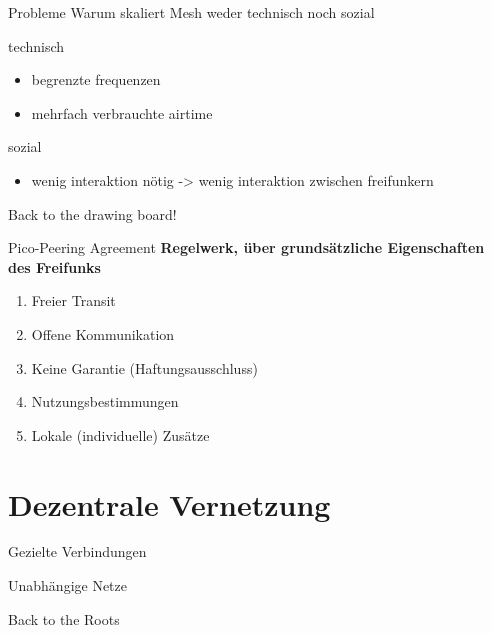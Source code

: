 \documentclass{beamer}
\begin{document}

	\begin{frame}{Probleme}
	Warum skaliert Mesh weder technisch noch sozial
	\begin{block}{technisch}
		\begin{itemize}
			\item begrenzte frequenzen
			\item mehrfach verbrauchte airtime
		\end{itemize}

	\end{block}
	\begin{block}{sozial}
		\begin{itemize}
			\item wenig interaktion nötig -> wenig interaktion zwischen freifunkern
		\end{itemize}
	\end{block}
	\end{frame}

	\begin{frame}[standout]
		Back to the drawing board!
	\end{frame}

	\begin{frame}{Pico-Peering Agreement}
		\textbf{Regelwerk, über grundsätzliche Eigenschaften des Freifunks}

		\begin{enumerate}
			\item Freier Transit
			\item Offene Kommunikation
			\item Keine Garantie (Haftungsausschluss)
			\item Nutzungsbestimmungen
			\item Lokale (individuelle) Zusätze
		\end{enumerate}
	\end{frame}

	\section{Dezentrale Vernetzung}
	\begin{frame}{Gezielte Verbindungen}
	\end{frame}
	\begin{frame}{Unabhängige Netze}
	\end{frame}
	\begin{frame}{Back to the Roots}
	\end{frame}
\end{document}
